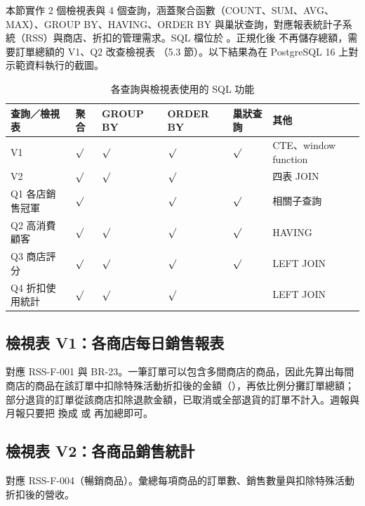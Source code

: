 本節實作 2 個檢視表與 4 個查詢，涵蓋聚合函數（COUNT、SUM、AVG、MAX）、GROUP BY、HAVING、ORDER BY 與巢狀查詢，對應報表統計子系統（RSS）與商店、折扣的管理需求。SQL 檔位於 。正規化後  不再儲存總額，需要訂單總額的 V1、Q2 改查檢視表 （5.3 節）。以下結果為在 PostgreSQL 16 上對示範資料執行的截圖。

\begingroup\small
\begin{xltabular}{\linewidth}{|>{\raggedright\arraybackslash}p{3.8cm}|>{\centering\arraybackslash}p{1.3cm}|>{\centering\arraybackslash}p{1.4cm}|>{\centering\arraybackslash}p{1.4cm}|>{\centering\arraybackslash}p{1.4cm}|X|}
\caption{各查詢與檢視表使用的 SQL 功能}\\
\hline{}\textbf{查詢／檢視表} & \textbf{聚合} & \textbf{GROUP BY} & \textbf{ORDER BY} & \textbf{巢狀查詢} & \textbf{其他}\\\hline\endhead
V1  & $\surd$ & $\surd$ & $\surd$ & $\surd$ & CTE、window function\\\hline
V2  & $\surd$ & $\surd$ & $\surd$ & & 四表 JOIN\\\hline
Q1 各店銷售冠軍 & $\surd$ & & $\surd$ & $\surd$ & 相關子查詢\\\hline
Q2 高消費顧客 & $\surd$ & $\surd$ & $\surd$ & $\surd$ & HAVING\\\hline
Q3 商店評分 & $\surd$ & $\surd$ & $\surd$ & $\surd$ & LEFT JOIN\\\hline
Q4 折扣使用統計 & $\surd$ & $\surd$ & $\surd$ & & LEFT JOIN\\\hline
\end{xltabular}
\endgroup

\subsection{檢視表 V1：各商店每日銷售報表}
對應 RSS-F-001 與 BR-23。一筆訂單可以包含多間商店的商品，因此先算出每間商店的商品在該訂單中扣除特殊活動折扣後的金額（），再依比例分攤訂單總額；部分退貨的訂單從該商店扣除退款金額，已取消或全部退貨的訂單不計入。週報與月報只要把  換成  或  再加總即可。

\subsection{檢視表 V2：各商品銷售統計}
對應 RSS-F-004（暢銷商品）。彙總每項商品的訂單數、銷售數量與扣除特殊活動折扣後的營收。


